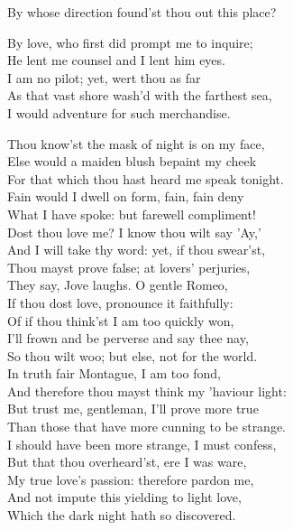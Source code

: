 \begin{speech}
By whose direction found'st thou out this place? \\

\end{speech}
\begin{speech}
By love, who first did prompt me to inquire; \\
He lent me counsel and I lent him eyes. \\
I am no pilot; yet, wert thou as far \\
As that vast shore wash'd with the farthest sea, \\
I would adventure for such merchandise. \\
\end{speech}
\begin{speech}
Thou know'st the mask of night is on my face, \\
Else would a maiden blush bepaint my cheek \\
For that which thou hast heard me speak tonight. \\
Fain would I dwell on form, fain, fain deny \\
What I have spoke: but farewell compliment! \\
Dost thou love me?   I know thou wilt say 'Ay,' \\
And I will take thy word: yet, if thou swear'st, \\
Thou mayst prove false; at lovers' perjuries, \\
They say, Jove laughs. O gentle Romeo, \\
If thou dost love, pronounce it faithfully: \\
Of if thou think'st I am too quickly won, \\
I'll frown and be perverse and say thee nay, \\
So thou wilt woo; but else, not for the world. \\
In truth fair Montague, I am too fond, \\
And therefore thou mayst think my 'haviour light: \\
But trust me, gentleman, I'll prove more true \\
Than those that have more cunning to be strange. \\
I should have been more strange, I must confess, \\
But that thou overheard'st, ere I was ware, \\
My true love's passion: therefore pardon me, \\
And not impute this yielding to light love, \\
Which the dark night hath so discovered. \\
\end{speech}
